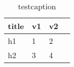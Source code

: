 \begin{table}[H]
\centering
\caption{testcaption}
\label{tab:testtable}
\begin{tabular}{|l|lll|}\hline
    title & v1 & v2 \\
    \hline 
    h1 & 1 & 2 \\
    h2 & 3 & 4 \\
    \hline 
\end{tabular}
\end{table}
